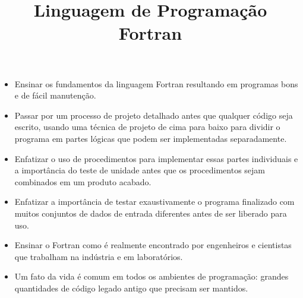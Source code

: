 \title{Linguagem de Programação Fortran}
\begin{frame}
\maketitle
\end{frame}
\begin{frame}
\begin{itemize}
  \item Ensinar os fundamentos da linguagem Fortran resultando em programas bons e de fácil manutenção.

  \item Passar por um processo de projeto detalhado antes que qualquer código seja escrito, usando uma técnica de projeto de cima para baixo para dividir o programa em partes lógicas que podem ser implementadas separadamente. 
  \item Enfatizar o uso de procedimentos para implementar essas partes individuais e a importância do teste de unidade antes que os procedimentos sejam combinados em um produto acabado. 
  \item Enfatizar a importância de testar exaustivamente o programa finalizado com muitos conjuntos de dados de entrada diferentes antes de ser liberado para uso.

  \item Ensinar o Fortran como é realmente encontrado por engenheiros e cientistas que trabalham na indústria e em laboratórios.

  \item Um fato da vida é comum em todos os ambientes de programação: grandes quantidades de código legado antigo que precisam ser mantidos.

\end{itemize}
\end{frame}
